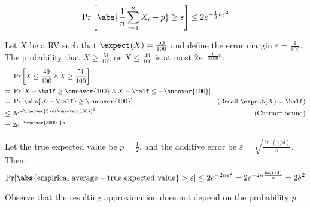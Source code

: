 \begin{equation}
    \Pr\left[\abs{\frac{1}{n}\sum_{i = 1}^{n} X_i - p} \geq \varepsilon\right] \leq 2e^{-\frac{1}{3}n\varepsilon^2}
\end{equation}

\begin{example}
    Let $X$ be a RV such that $\expect(X) = \frac{50}{100}$ and define the error margin $\varepsilon = \frac{1}{100}$. The probability that $X \geq \frac{51}{100}$ or $X \leq \frac{49}{100}$ is at most $2e^{-\frac{1}{30000}n}$:
    \begin{align*}
            &\ \Pr\left[X \leq \frac{49}{100} \wedge X \geq \frac{51}{100}\right]                   & \\
           =&\ \Pr\left[X - \half \geq \oneover{100} \wedge X - \half \leq - \oneover{100}\right]   & \\
           =&\ \Pr\left[\abs{X - \half} \geq \oneover{100}\right]                                   & \text{(Recall } \expect(X) = \half) \\
        \leq&\ 2e^{-\oneover{3} n \left(\oneover{100}\right)^2}                                     & \text{(Chernoff bound)} \\
           =&\ 2e^{-\oneover{30000}n}                                                               &
    \end{align*}
\end{example}

\begin{example}
    Let the true expected value be $p = \frac{1}{2}$, and the additive error be $\varepsilon = \sqrt{\frac{\ln(1/\delta)}{n}}$. Then:
    \[
        \Pr[\abs{\text{empirical average} - \text{true expected value}} > \varepsilon] \leq 2e^{-2n\varepsilon^2} = 2e^{-2n \frac{\ln(1/\delta)}{n}} = 2 \delta^2
    \]
    
    Observe that the resulting approximation does not depend on the probability $p$.
\end{example}
